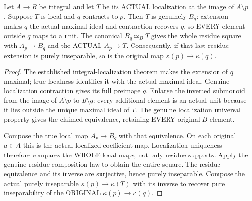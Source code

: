 \begin{theorem}
\label{algebra:actual-normalization-local-residue-square}
Let $A\to B$ be integral and let $T$ be its ACTUAL localization
at the image of $A\setminus p$. Suppose $T$ is local and $q$
contracts to $p$. Then $T$ is genuinely $B_q$: extension makes
$q$ the actual maximal ideal and contraction recovers $q$, so
EVERY element outside $q$ maps to a unit. The canonical
$B_q\simeq_B T$ gives the whole residue square with
$A_p\to B_q$ and the ACTUAL $A_p\to T$. Consequently, if
that last residue extension is purely inseparable, so is the
original map $\kappa(p)\to\kappa(q)$.
\leanok
\end{theorem}
\begin{proof}
The established integral-localization theorem makes the extension
of $q$ maximal; true localness identifies it with the actual
maximal ideal. Genuine localization contraction gives its full
preimage $q$. Enlarge the inverted submonoid from the image of
$A\setminus p$ to $B\setminus q$: every additional element
is an actual unit because it lies outside the unique maximal
ideal of $T$. The genuine localization universal property gives
the claimed equivalence, retaining EVERY original $B$ element.

Compose the true local map $A_p\to B_q$ with that equivalence.
On each original $a\in A$ this is the actual localized
coefficient map. Localization uniqueness therefore compares the
WHOLE local maps, not only residue supports. Apply the genuine
residue composition law to obtain the entire square.
The residue equivalence and its inverse are surjective, hence
purely inseparable. Compose the actual purely inseparable
$\kappa(p)\to\kappa(T)$ with its inverse to recover pure
inseparability of the ORIGINAL $\kappa(p)\to\kappa(q)$.
\end{proof}

